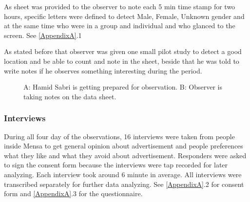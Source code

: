 As sheet was provided to the observer to note each 5 min time stamp for two hours, specific letters were defined to detect Male, Female, Unknown gender and at the same time who were in a group and individual and who glanced to the screen. See \ref{AppendixA}.1

As stated before that observer was given one small pilot study to detect a good location and be able to count and note in the sheet, beside that he was told to write notes if he observes something interesting during the period.

\begin{figure}[!htb]
    \centering
    \hfill
    \caption{A: Hamid Sabri is getting prepared for observation. B: Observer is taking notes on the data sheet.}%
    \label{fig:Observer}%
\end{figure}


\subsubsection{Interviews}

During all four day of the observations, 16 interviews were taken from people inside Mensa to get general opinion about advertisement and people preferences what they like and what they avoid about advertisement. Responders were asked to sign the consent form because the interviews were tap recorded for later analyzing.  Each interview took around 6 minute in average. All interviews were transcribed separately for further data analyzing.
See \ref{AppendixA}.2 for consent form and  \ref{AppendixA}.3 for the questionnaire.

